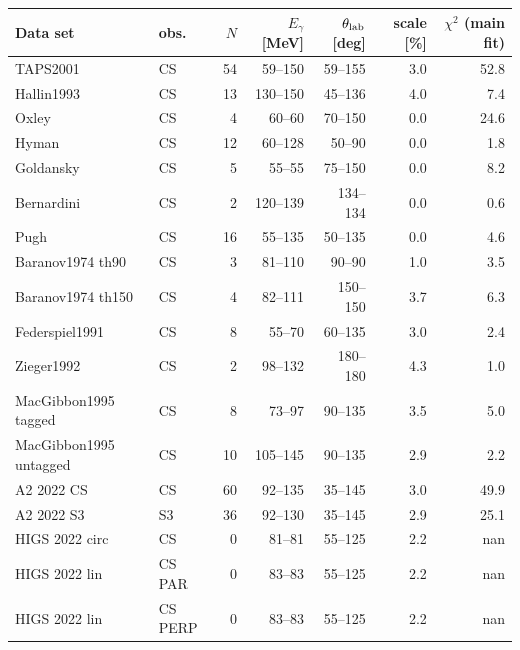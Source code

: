 \begin{tabular}{llrrrrr}
\hline
Data set & obs. & $N$ & $E_\gamma$ [MeV] & $\theta_{\rm lab}$ [deg] & scale [\%] & $\chi^2$ (main fit)\\\hline
TAPS2001 \cite{OlmosdeLeon:2001zn} & CS & 54 & 59--150 & 59--155 & 3.0 & 52.8\\
Hallin1993 \cite{Hallin:1993ft} & CS & 13 & 130--150 & 45--136 & 4.0 & 7.4\\
Oxley \cite{Oxley:1958zz} & CS & 4 & 60--60 & 70--150 & 0.0 & 24.6\\
Hyman \cite{Hyman:1959zz} & CS & 12 & 60--128 & 50--90 & 0.0 & 1.8\\
Goldansky \cite{Goldansky:1960zz} & CS & 5 & 55--55 & 75--150 & 0.0 & 8.2\\
Bernardini \cite{Bernardini:1960wya} & CS & 2 & 120--139 & 134--134 & 0.0 & 0.6\\
Pugh \cite{Pugh:1957zz} & CS & 16 & 55--135 & 50--135 & 0.0 & 4.6\\
Baranov1974 th90 \cite{Baranov:1974ec} & CS & 3 & 81--110 & 90--90 & 1.0 & 3.5\\
Baranov1974 th150 \cite{Baranov:1974ec} & CS & 4 & 82--111 & 150--150 & 3.7 & 6.3\\
Federspiel1991 \cite{Federspiel:1991yd} & CS & 8 & 55--70 & 60--135 & 3.0 & 2.4\\
Zieger1992 \cite{Zieger:1992jq} & CS & 2 & 98--132 & 180--180 & 4.3 & 1.0\\
MacGibbon1995 tagged \cite{MacGibbon:1995in} & CS & 8 & 73--97 & 90--135 & 3.5 & 5.0\\
MacGibbon1995 untagged \cite{MacGibbon:1995in} & CS & 10 & 105--145 & 90--135 & 2.9 & 2.2\\
A2 2022 CS \cite{A2:2021wmm} & CS & 60 & 92--135 & 35--145 & 3.0 & 49.9\\
A2 2022 S3 \cite{A2:2021wmm} & S3 & 36 & 92--130 & 35--145 & 2.9 & 25.1\\
HIGS 2022 circ \cite{Li:2022vnz} & CS & 0 & 81--81 & 55--125 & 2.2 & nan\\
HIGS 2022 lin \cite{Li:2022vnz} & CS PAR & 0 & 83--83 & 55--125 & 2.2 & nan\\
HIGS 2022 lin \cite{Li:2022vnz} & CS PERP & 0 & 83--83 & 55--125 & 2.2 & nan\\
\hline
\end{tabular}

